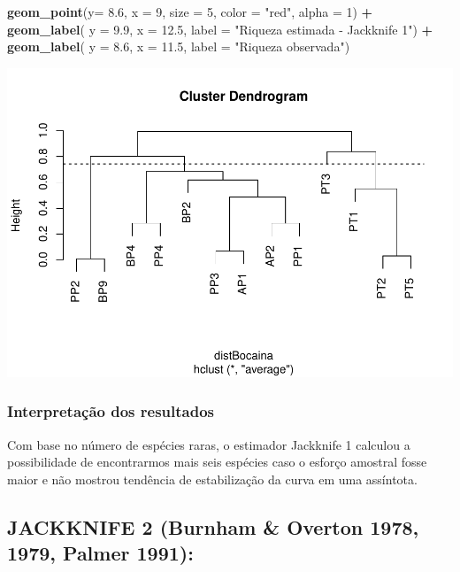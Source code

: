 \documentclass[
]{book}
\newenvironment{Shaded}{\begin{snugshade}}{\end{snugshade}}
\newcommand{\DataTypeTok}[1]{\textcolor[rgb]{0.13,0.29,0.53}{#1}}
\newcommand{\DecValTok}[1]{\textcolor[rgb]{0.00,0.00,0.81}{#1}}
\newcommand{\FloatTok}[1]{\textcolor[rgb]{0.00,0.00,0.81}{#1}}
\newcommand{\KeywordTok}[1]{\textcolor[rgb]{0.13,0.29,0.53}{\textbf{#1}}}
\newcommand{\NormalTok}[1]{#1}
\newcommand{\OperatorTok}[1]{\textcolor[rgb]{0.81,0.36,0.00}{\textbf{#1}}}
\newcommand{\StringTok}[1]{\textcolor[rgb]{0.31,0.60,0.02}{#1}}
\begin{document}
\begin{Shaded}
\begin{Highlighting}[]
\StringTok{  }\KeywordTok{geom_point}\NormalTok{(}\DataTypeTok{y=} \FloatTok{8.6}\NormalTok{, }\DataTypeTok{x =} \DecValTok{9}\NormalTok{, }\DataTypeTok{size =} \DecValTok{5}\NormalTok{, }\DataTypeTok{color =} \StringTok{"red"}\NormalTok{, }\DataTypeTok{alpha =} \DecValTok{1}\NormalTok{) }\OperatorTok{+}\StringTok{ }
\StringTok{  }\KeywordTok{geom_label}\NormalTok{( }\DataTypeTok{y =} \FloatTok{9.9}\NormalTok{, }\DataTypeTok{x =} \FloatTok{12.5}\NormalTok{, }\DataTypeTok{label =} \StringTok{"Riqueza estimada - Jackknife 1"}\NormalTok{) }\OperatorTok{+}
\StringTok{  }\KeywordTok{geom_label}\NormalTok{( }\DataTypeTok{y =} \FloatTok{8.6}\NormalTok{, }\DataTypeTok{x =} \FloatTok{11.5}\NormalTok{, }\DataTypeTok{label =} \StringTok{"Riqueza observada"}\NormalTok{)}
\end{Highlighting}
\end{Shaded}

\includegraphics{livro_r_ecologia_files/figure-latex/unnamed-chunk-27-1.pdf}

\hypertarget{interpretauxe7uxe3o-dos-resultados-3}{%
\subsubsection{Interpretação dos resultados}\label{interpretauxe7uxe3o-dos-resultados-3}}

Com base no número de espécies raras, o estimador Jackknife 1 calculou a possibilidade de encontrarmos mais seis espécies caso o esforço amostral fosse maior e não mostrou tendência de estabilização da curva em uma assíntota.

\hypertarget{jackknife-2-burnham-overton-1978-1979-palmer-1991}{%
\subsection{JACKKNIFE 2 (Burnham \& Overton 1978, 1979, Palmer 1991):}\label{jackknife-2-burnham-overton-1978-1979-palmer-1991}}
\end{document}
